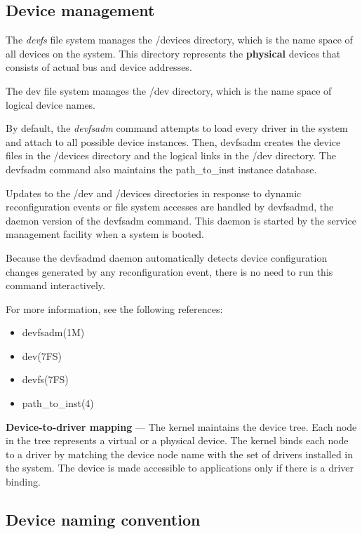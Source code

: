 \documentclass[11pt]{article}
\begin{document}
\subsection*{Device management}

The {\it devfs} file system manages the /devices directory, which is the name
space of all devices on the system. This directory represents the {\bf physical}
devices that consists of actual bus and device addresses.

The dev file system manages the /dev directory, which is the name space of
logical device names.

By default, the {\it devfsadm} command attempts to load every driver in the
system and attach to all possible device instances. Then, devfsadm creates the
device files in the /devices directory and the logical links in the /dev
directory. The devfsadm command also maintains the path\_to\_inst instance
database.

Updates to the /dev and /devices directories in response to dynamic
reconfiguration events or file system accesses are handled by devfsadmd, the
daemon version of the devfsadm command. This daemon is started by the service
management facility when a system is booted.

Because the devfsadmd daemon automatically detects device configuration changes
generated by any reconfiguration event, there is no need to run this command
interactively.

For more information, see the following references:

\begin{itemize}
\item devfsadm(1M)
\item dev(7FS)
\item devfs(7FS)
\item path\_to\_inst(4)
\end{itemize}

{\bf Device-to-driver mapping} --- The kernel maintains the device tree. Each
node in the tree represents a virtual or a physical device. The kernel binds
each node to a driver by matching the device node name with the set of drivers
installed in the system. The device is made accessible to applications only if
there is a driver binding.

\subsection*{Device naming convention}
\end{document}
